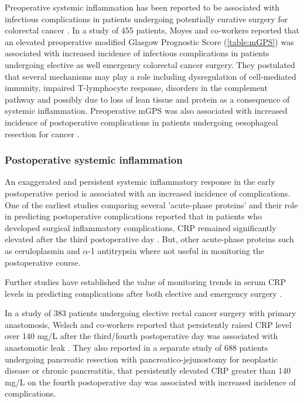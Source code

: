 Preoperative systemic inflammation has been reported to be associated with infectious complications in patients undergoing potentially curative surgery for colorectal cancer \parencite{moyes_preoperative_2009}. 
In a study of 455 patients, Moyes and co-workers reported that an elevated preoperative modified Glasgow Prognostic Score (\ref{table:mGPS}) was associated with increased incidence of infectious complications in patients undergoing elective as well emergency colorectal cancer surgery. 
They postulated that several mechanisms may play a role including dysregulation of cell-mediated immunity, impaired T-lymphocyte response, disorders in the complement pathway and possibly due to loss of lean tissue and protein as a consequence of systemic inflammation. 
Preoperative mGPS was also associated with increased incidence of postoperative complications in patients undergoing oesophageal resection for cancer \parencite{vashist_glasgow_2010}. 

\subsubsection{Postoperative systemic inflammation}
An exaggerated and persistent systemic inflammatory response in the early postoperative period is associated with an increased incidence of complications. 
One of the earliest studies comparing several 'acute-phase proteins' and their role in predicting postoperative complications reported that in patients who developed surgical inflammatory complications, CRP remained significantly elevated after the third postoperative day \parencite{fischer_quantitation_1976}.
But,  other acute-phase proteins such as ceruloplasmin and  $\alpha$-1 antitrypsin where not useful in monitoring the postoperative course. 

Further studies have established the value of monitoring trends in serum CRP levels in predicting complications after both elective and emergency surgery \parencite{mustard_c-reactive_1987}. 

In a study of 383 patients undergoing elective rectal cancer surgery with primary anastomosis, Welsch and co-workers reported that persistently raised CRP level over 140 mg/L after the third/fourth postoperative day was associated with anastomotic leak \parencite{welsch_c-reactive_2007}. 
They also reported in a separate study of 688 patients undergoing pancreatic resection with pancreatico-jejunostomy for neoplastic disease or chronic pancreatitis, that persistently elevated CRP greater than 140 mg/L on the fourth postoperative day was associated with increased incidence of complications. 

